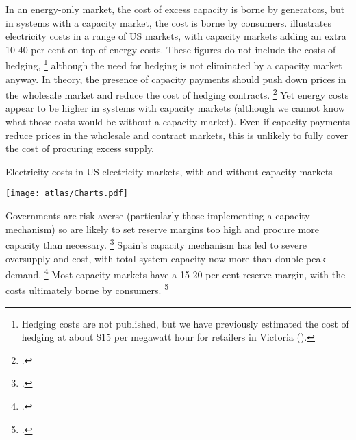 \documentclass[FrontPage]{grattan}
\begin{document}
In an energy-only market, the cost of excess capacity is borne by generators, but in systems with a capacity market, the cost is borne by consumers.  illustrates electricity costs in a range of US markets, with capacity markets adding an extra 10-40 per cent on top of energy costs. These figures do not include the costs of hedging,%
\footnote{Hedging costs are not published, but we have previously estimated the cost of hedging at about \$15 per megawatt hour for retailers in Victoria (\textcite{WoodBlowers-2017-Retail-competition}).} 
although the need for hedging is not eliminated by a capacity market anyway.
In theory, the presence of capacity payments should push down prices in the wholesale market and reduce the cost of hedging contracts.%
\footcite{Cramton2013CapacityMarketFundamentals}
Yet energy costs appear to be higher in systems with capacity markets (although we cannot know what those costs would be without a capacity market). Even if capacity payments reduce prices in the wholesale and contract markets, this is unlikely to fully cover the cost of procuring excess supply.

\begin{figureTop}
\caption{Electricity costs in US electricity markets, with and without capacity markets}\label{fig:electricity-costs-in-US-electricity-markets-with-and-without-capacity-markets}
\texttt{[image: atlas/Charts.pdf]}
\end{figureTop}

Governments are risk-averse (particularly those implementing a capacity mechanism) so are likely to set reserve margins too high and procure more capacity than necessary.%
\footcite{NewberyGrubb2014SecurityOfSupply}
Spain's capacity mechanism has led to severe oversupply and cost, with total system capacity now more than double peak demand.%
\footcite{Wynn2016SpainCapacityMechanism}
Most capacity markets have a 15-20 per cent reserve margin, with the costs ultimately borne by consumers.%
\footcite{bowring2013capacity}
\end{document}
